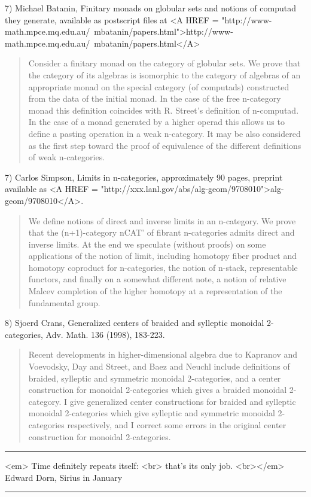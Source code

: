 7) Michael Batanin, Finitary monads on globular sets and notions of
computad they generate, available as postscript files at
<A HREF = "http://www-math.mpce.mq.edu.au/~mbatanin/papers.html">http://www-math.mpce.mq.edu.au/~mbatanin/papers.html</A>

\begin{quote}
Consider a finitary monad on the category of globular sets. We prove
that the category of its algebras is isomorphic to the category of
algebras of an appropriate monad on the special category (of
computads) constructed from the data of the initial monad. In the case
of the free n-category monad this definition coincides with R.
Street's definition of n-computad. In the case of a monad generated
by a higher operad this allows us to define a pasting operation in a
weak n-category. It may be also considered as the first step toward
the proof of equivalence of the different definitions of weak
n-categories.
\end{quote}

7) Carlos Simpson, Limits in n-categories, approximately 90 pages,
preprint available as 
<A HREF =
"http://xxx.lanl.gov/abs/alg-geom/9708010">alg-geom/9708010</A>.
\begin{quote}
We define notions of direct and inverse limits in an n-category.  We
prove that the (n+1)-category nCAT' of fibrant n-categories admits
direct and inverse limits. At the end we speculate (without proofs) on
some applications of the notion of limit, including homotopy fiber
product and homotopy coproduct for n-categories, the notion of
n-stack, representable functors, and finally on a somewhat different
note, a notion of relative Malcev completion of the higher homotopy at
a representation of the fundamental group.
\end{quote}

8) Sjoerd Crans, Generalized centers of braided and sylleptic
monoidal 2-categories, Adv. Math. 136 (1998), 183-223.

\begin{quote}
Recent developments in higher-dimensional algebra due to Kapranov and
Voevodsky, Day and Street, and Baez and Neuchl include definitions of
braided, sylleptic and symmetric monoidal 2-categories, and a center
construction for monoidal 2-categories which gives a braided monoidal
2-category. I give generalized center constructions for braided and
sylleptic monoidal 2-categories which give sylleptic and symmetric
monoidal 2-categories respectively, and I correct some errors in the
original center construction for monoidal 2-categories.
\end{quote}











 \par\noindent\rule{\textwidth}{0.4pt}
<em> Time definitely repeats itself: <br>
 that's its only job. <br></em>
 Edward Dorn, Sirius in January


\par\noindent\rule{\textwidth}{0.4pt}

